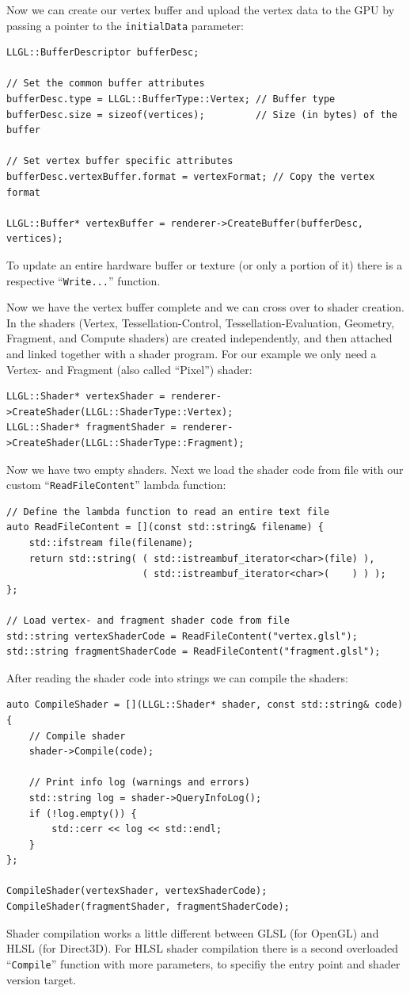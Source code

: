 \documentclass{article}
\begin{document}
Now we can create our vertex buffer and upload the vertex data to the GPU by passing a pointer
to the \texttt{initialData} parameter:
\begin{lstlisting}
LLGL::BufferDescriptor bufferDesc;

// Set the common buffer attributes
bufferDesc.type = LLGL::BufferType::Vertex; // Buffer type
bufferDesc.size = sizeof(vertices);         // Size (in bytes) of the buffer

// Set vertex buffer specific attributes
bufferDesc.vertexBuffer.format = vertexFormat; // Copy the vertex format

LLGL::Buffer* vertexBuffer = renderer->CreateBuffer(bufferDesc, vertices);
\end{lstlisting}
To update an entire hardware buffer or texture (or only a portion of it) there is a respective
``\texttt{Write...}'' function.

Now we have the vertex buffer complete and we can cross over to shader creation.
In \LLGL the shaders (Vertex, Tessellation-Control, Tessellation-Evaluation, Geometry, Fragment, and Compute shaders)
are created independently, and then attached and linked together with a shader program.
For our example we only need a Vertex- and Fragment (also called ``Pixel'') shader:
\begin{lstlisting}
LLGL::Shader* vertexShader = renderer->CreateShader(LLGL::ShaderType::Vertex);
LLGL::Shader* fragmentShader = renderer->CreateShader(LLGL::ShaderType::Fragment);
\end{lstlisting}
Now we have two empty shaders. Next we load the shader code from file with
our custom ``\texttt{ReadFileContent}'' lambda function:
\begin{lstlisting}
// Define the lambda function to read an entire text file
auto ReadFileContent = [](const std::string& filename) {
    std::ifstream file(filename);
    return std::string( ( std::istreambuf_iterator<char>(file) ),
                        ( std::istreambuf_iterator<char>(    ) ) );
};

// Load vertex- and fragment shader code from file
std::string vertexShaderCode = ReadFileContent("vertex.glsl");
std::string fragmentShaderCode = ReadFileContent("fragment.glsl");
\end{lstlisting}

After reading the shader code into strings we can compile the shaders:
\begin{lstlisting}
auto CompileShader = [](LLGL::Shader* shader, const std::string& code) {
    // Compile shader
    shader->Compile(code);
    
    // Print info log (warnings and errors)
    std::string log = shader->QueryInfoLog();
    if (!log.empty()) {
        std::cerr << log << std::endl;
    }
};

CompileShader(vertexShader, vertexShaderCode);
CompileShader(fragmentShader, fragmentShaderCode);
\end{lstlisting}
Shader compilation works a little different between GLSL (for OpenGL) and HLSL (for Direct3D).
For HLSL shader compilation there is a second overloaded ``\texttt{Compile}'' function with more parameters,
to specifiy the entry point and shader version target.
\end{document}
